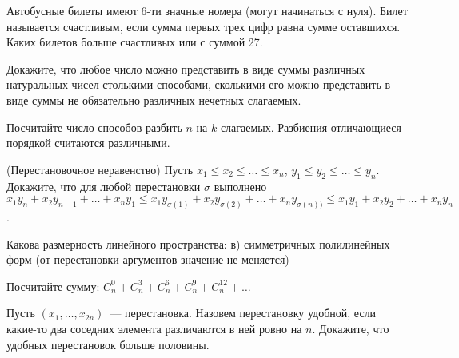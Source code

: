 \setcounter{curtask}{20}


\begin{task}
    Автобусные билеты имеют 6-ти значные номера (могут начинаться с нуля). Билет
    называется счастливым, если сумма первых трех цифр равна сумме оставшихся. Каких
    билетов больше счастливых или с суммой 27.
\end{task}

\begin{task}
    Докажите, что любое число можно представить в виде суммы различных натуральных
    чисел столькими способами, сколькими его можно представить в виде суммы не
    обязательно различных нечетных слагаемых.
\end{task}

\begin{task}
    Посчитайте число способов разбить $n$ на $k$ слагаемых. Разбиения отличающиеся
    порядкой считаются различными.
\end{task}

\begin{task}(Перестановочное неравенство)
    Пусть $x_1 \le x_2 \le \dots \le x_n$, $y_1 \le y_2 \le \dots \le y_n$. Докажите,
    что для любой перестановки $\sigma$ выполнено $x_1 y_n + x_2 y_{n - 1} + \dots +
    x_n y_1 \le x_1 y_{\sigma(1)} + x_2 y_{\sigma(2)} + \dots + x_n y_{\sigma(n))} \le
    x_1 y_1 + x_2 y_2 + \dots + x_n y_n$.
\end{task}

\breakline

\begin{ptask}{17}
    Какова размерность линейного пространства:
	в) симметричных полилинейных форм (от перестановки аргументов значение не
    	меняется)
\end{ptask}

\begin{ptask}{18}
    Посчитайте сумму:
    $C_{n}^{0} + C_{n}^{3} + C_{n}^{6} + C_{n}^{9} + C_{n}^{12} + \dots$
\end{ptask}

\begin{ptask}{19}
    Пусть $(x_1, \dots, x_{2n})$~--- перестановка. Назовем перестановку удобной, если
    какие-то два соседних элемента различаются в ней ровно на $n$. Докажите, что
    удобных перестановок больше половины.
\end{ptask}